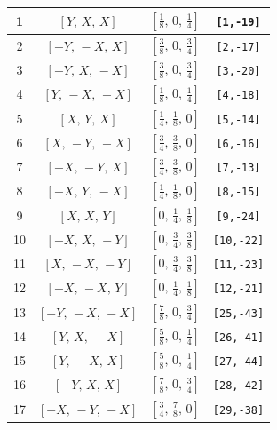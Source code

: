 \documentclass[fleqn,8pt]{jsarticle}
\begin{document}
\begin{longtable}{cccc}
1 & $\left[ Y,\, X,\, X \right]$ & $\left[ \frac{1}{8},\, 0,\, \frac{1}{4} \right]$ & {\tt [1,-19]} \\ \hline
2 & $\left[ - Y,\, - X,\, X \right]$ & $\left[ \frac{3}{8},\, 0,\, \frac{3}{4} \right]$ & {\tt [2,-17]} \\ \hline
3 & $\left[ - Y,\, X,\, - X \right]$ & $\left[ \frac{3}{8},\, 0,\, \frac{3}{4} \right]$ & {\tt [3,-20]} \\ \hline
4 & $\left[ Y,\, - X,\, - X \right]$ & $\left[ \frac{1}{8},\, 0,\, \frac{1}{4} \right]$ & {\tt [4,-18]} \\ \hline
5 & $\left[ X,\, Y,\, X \right]$ & $\left[ \frac{1}{4},\, \frac{1}{8},\, 0 \right]$ & {\tt [5,-14]} \\ \hline
6 & $\left[ X,\, - Y,\, - X \right]$ & $\left[ \frac{3}{4},\, \frac{3}{8},\, 0 \right]$ & {\tt [6,-16]} \\ \hline
7 & $\left[ - X,\, - Y,\, X \right]$ & $\left[ \frac{3}{4},\, \frac{3}{8},\, 0 \right]$ & {\tt [7,-13]} \\ \hline
8 & $\left[ - X,\, Y,\, - X \right]$ & $\left[ \frac{1}{4},\, \frac{1}{8},\, 0 \right]$ & {\tt [8,-15]} \\ \hline
9 & $\left[ X,\, X,\, Y \right]$ & $\left[ 0,\, \frac{1}{4},\, \frac{1}{8} \right]$ & {\tt [9,-24]} \\ \hline
10 & $\left[ - X,\, X,\, - Y \right]$ & $\left[ 0,\, \frac{3}{4},\, \frac{3}{8} \right]$ & {\tt [10,-22]} \\ \hline
11 & $\left[ X,\, - X,\, - Y \right]$ & $\left[ 0,\, \frac{3}{4},\, \frac{3}{8} \right]$ & {\tt [11,-23]} \\ \hline
12 & $\left[ - X,\, - X,\, Y \right]$ & $\left[ 0,\, \frac{1}{4},\, \frac{1}{8} \right]$ & {\tt [12,-21]} \\ \hline
13 & $\left[ - Y,\, - X,\, - X \right]$ & $\left[ \frac{7}{8},\, 0,\, \frac{3}{4} \right]$ & {\tt [25,-43]} \\ \hline
14 & $\left[ Y,\, X,\, - X \right]$ & $\left[ \frac{5}{8},\, 0,\, \frac{1}{4} \right]$ & {\tt [26,-41]} \\ \hline
15 & $\left[ Y,\, - X,\, X \right]$ & $\left[ \frac{5}{8},\, 0,\, \frac{1}{4} \right]$ & {\tt [27,-44]} \\ \hline
16 & $\left[ - Y,\, X,\, X \right]$ & $\left[ \frac{7}{8},\, 0,\, \frac{3}{4} \right]$ & {\tt [28,-42]} \\ \hline
17 & $\left[ - X,\, - Y,\, - X \right]$ & $\left[ \frac{3}{4},\, \frac{7}{8},\, 0 \right]$ & {\tt [29,-38]} \\ \hline

\end{longtable}
\end{document}
